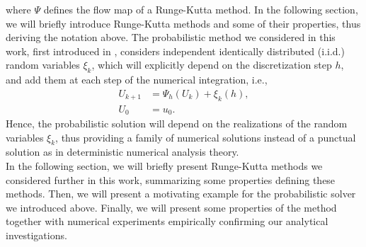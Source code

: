 where $\Psi$ defines the flow map of a Runge-Kutta method. In the following section, we will briefly introduce Runge-Kutta methods and some of their properties, thus deriving the notation above. The probabilistic method we considered in this work, first introduced in \cite{CGS16}, considers independent identically distributed (i.i.d.) random variables $\xi_k$, which will explicitly depend on the discretization step $h$, and add them at each step of the numerical integration, i.e., 
\begin{equation}\label{eq:probMethod}
\begin{aligned}
	U_{k+1} &= \Psi_h(U_k) + \xi_k(h), \\
	U_0 &= u_0.
\end{aligned}
\end{equation}
Hence, the probabilistic solution will depend on the realizations of the random variables $\xi_k$, thus providing a family of numerical solutions instead of a punctual solution as in deterministic numerical analysis theory. \\
In the following section, we will briefly present Runge-Kutta methods we considered further in this work, summarizing some properties defining these methods. Then, we will present a motivating example for the probabilistic solver we introduced above. Finally, we will present some properties of the method together with numerical experiments empirically confirming our analytical investigations. 




